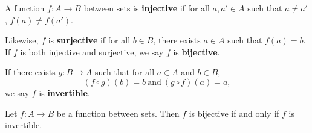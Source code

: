 \documentclass{amsart}
\begin{document}
\begin{definition}
   A function \(f: A\to B\) between sets is \textbf{injective} if for all \(a,
	a'\in A\) such that \(a\ne a'\), \(f(a) \ne f(a')\).

	Likewise, \(f\) is
	\textbf{surjective} if for all \(b\in B\), there exists \(a\in A\) such that
	\(f(a) = b\). If \(f\) is both injective and surjective, we say \(f\) is
	\textbf{bijective}.

	If there exists \(g: B\to A\) such that for all \(a\in A\) and \(b\in B\),
	\[
		(f\circ g)(b) = b ~\text{and}~(g\circ f)(a) = a,
	\] 
	we say \(f\) is \textbf{invertible}.
\end{definition}
\begin{theorem}
	Let \(f: A\to B\) be a function between sets. Then \(f\) is bijective if and
	only if \(f\) is invertible.
\end{theorem}
\end{document}
